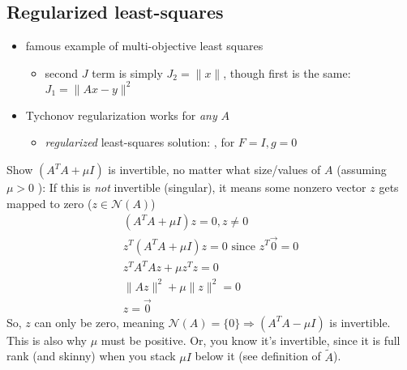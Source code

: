 \documentclass[10pt,letterpaper]{article}
\begin{document}
\subsection{Regularized least-squares}
\label{sec-6_4}

\begin{itemize}
\item famous example of multi-objective least squares

\begin{itemize}
\item second $J$ term is simply $J_2 = \|x\|$, though first is the same: $J_1 = \|Ax-y\| ^{2}$
\end{itemize}

\item Tychonov regularization works for \emph{any} $A$

\begin{itemize}
\item \emph{regularized} least-squares solution: , for $F=I, g=0$
\end{itemize}

\end{itemize}
Show $(A ^{T} A + \mu I)$ is invertible, no matter what size/values of $A$ (assuming $\mu > 0$ ): 
If this is \emph{not} invertible (singular), it means some nonzero vector $z$ gets mapped to zero ($z \in \mathcal{N}(A)$)
\begin{eqnarray}
(A ^{T} A + \mu I) z= 0, z \ne 0 \\
z ^{T} (A ^{T} A + \mu I) z = 0 \text{ since } z^T \vec{0} =0 \\
z ^{T} A ^{T} A z + \mu z ^{T} z = 0 \\
\| A z \| ^{2} + \mu \| z \| ^{2} = 0 \\
z = \vec{0} 
\end{eqnarray}
So, $z$ can only be zero, meaning $\mathcal{N}(A) = \{0\} \Rightarrow (A ^{T} A -\mu I)$ is invertible. This is also why $\mu$ must be positive.
Or, you know it's invertible, since it is full rank (and skinny) when you stack $\mu I$ below it (see definition of $\tilde A$).
\end{document}
